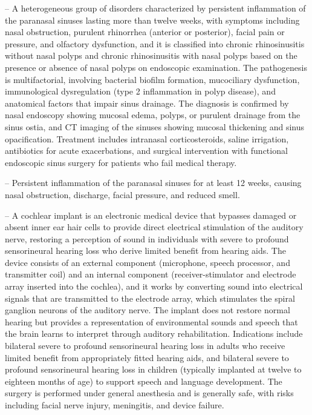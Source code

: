 -- A heterogeneous group of disorders characterized by persistent inflammation of the paranasal sinuses lasting more than twelve weeks, with symptoms including nasal obstruction, purulent rhinorrhea (anterior or posterior), facial pain or pressure, and olfactory dysfunction, and it is classified into chronic rhinosinusitis without nasal polyps and chronic rhinosinusitis with nasal polyps based on the presence or absence of nasal polyps on endoscopic examination. The pathogenesis is multifactorial, involving bacterial biofilm formation, mucociliary dysfunction, immunological dysregulation (type 2 inflammation in polyp disease), and anatomical factors that impair sinus drainage. The diagnosis is confirmed by nasal endoscopy showing mucosal edema, polyps, or purulent drainage from the sinus ostia, and CT imaging of the sinuses showing mucosal thickening and sinus opacification. Treatment includes intranasal corticosteroids, saline irrigation, antibiotics for acute exacerbations, and surgical intervention with functional endoscopic sinus surgery for patients who fail medical therapy.

-- Persistent inflammation of the paranasal sinuses for at least 12 weeks, causing nasal obstruction, discharge, facial pressure, and reduced smell.

-- A cochlear implant is an electronic medical device that bypasses damaged or absent inner ear hair cells to provide direct electrical stimulation of the auditory nerve, restoring a perception of sound in individuals with severe to profound sensorineural hearing loss who derive limited benefit from hearing aids. The device consists of an external component (microphone, speech processor, and transmitter coil) and an internal component (receiver-stimulator and electrode array inserted into the cochlea), and it works by converting sound into electrical signals that are transmitted to the electrode array, which stimulates the spiral ganglion neurons of the auditory nerve. The implant does not restore normal hearing but provides a representation of environmental sounds and speech that the brain learns to interpret through auditory rehabilitation. Indications include bilateral severe to profound sensorineural hearing loss in adults who receive limited benefit from appropriately fitted hearing aids, and bilateral severe to profound sensorineural hearing loss in children (typically implanted at twelve to eighteen months of age) to support speech and language development. The surgery is performed under general anesthesia and is generally safe, with risks including facial nerve injury, meningitis, and device failure.

